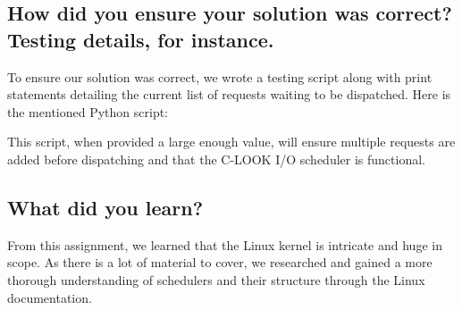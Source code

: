 \documentclass[draftclsnofoot, onecolumn]{IEEEtran}
\begin{document}
\subsection{How did you ensure your solution was correct? Testing details, for instance.}
To ensure our solution was correct, we wrote a testing script along with print statements detailing the current list of requests waiting to be dispatched. Here is the mentioned Python script:

\begin{center}

\end{center}
This script, when provided a large enough value, will ensure multiple requests are added before dispatching and that the C-LOOK I/O scheduler is functional.
\subsection{What did you learn?}
From this assignment, we learned that the Linux kernel is intricate and huge in scope. As there is a lot of material to cover, we researched and gained a more thorough understanding of schedulers and their structure through the Linux documentation.
\end{document}
